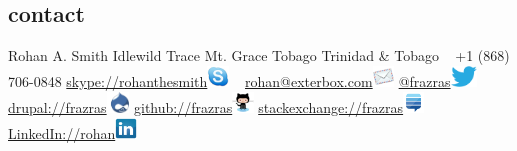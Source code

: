\documentclass[]{friggeri-cv} %
\begin{document}


\begin{aside} %
\section{contact}
Rohan A. Smith
Idlewild Trace
Mt. Grace
Tobago
Trinidad \& Tobago
~
+1 (868) 706-0848
\href {skype://rohanthesmith}{skype://rohanthesmith}\includegraphics[height=16pt]{images/skype.png}
~
\href{mailto:rohan@exterbox.com}{rohan@exterbox.com}\includegraphics[height=16pt]{email.png}
\href{http://twitter.com/frazras}{@frazras}\includegraphics[height=16pt]{twitter.eps}
\href{http://drupal.org/user/34622}{drupal://frazras}\includegraphics[height=16pt]{druplicon.png}
\href {https://github.com/frazras}{github://frazras}\includegraphics[height=16pt]{octocat.png}
\href{http://stackexchange.com/users/530574/frazras?tab=accounts}{stackexchange://frazras}\includegraphics[height=16pt]{stackexchange.png}
\href {http://jm.linkedin.com/in/rohansmith}{LinkedIn://rohan}\includegraphics[height=16pt]{linkedin.png}

\end{aside}
\end{document}
